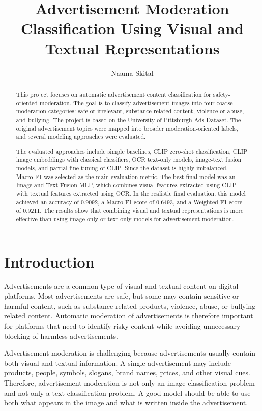 \documentclass[12pt]{article}
\title{Advertisement Moderation Classification Using Visual and Textual Representations}
\author{Naama Skital}
\date{}
\begin{document}
\maketitle

\begin{abstract}
This project focuses on automatic advertisement content classification for safety-oriented moderation. The goal is to classify advertisement images into four coarse moderation categories: safe or irrelevant, substance-related content, violence or abuse, and bullying. The project is based on the University of Pittsburgh Ads Dataset. The original advertisement topics were mapped into broader moderation-oriented labels, and several modeling approaches were evaluated.

The evaluated approaches include simple baselines, CLIP zero-shot classification, CLIP image embeddings with classical classifiers, OCR text-only models, image-text fusion models, and partial fine-tuning of CLIP. Since the dataset is highly imbalanced, Macro-F1 was selected as the main evaluation metric. The best final model was an Image and Text Fusion MLP, which combines visual features extracted using CLIP with textual features extracted using OCR. In the realistic final evaluation, this model achieved an accuracy of 0.9092, a Macro-F1 score of 0.6493, and a Weighted-F1 score of 0.9211. The results show that combining visual and textual representations is more effective than using image-only or text-only models for advertisement moderation.
\end{abstract}

\section{Introduction}

Advertisements are a common type of visual and textual content on digital platforms. Most advertisements are safe, but some may contain sensitive or harmful content, such as substance-related products, violence, abuse, or bullying-related content. Automatic moderation of advertisements is therefore important for platforms that need to identify risky content while avoiding unnecessary blocking of harmless advertisements.

Advertisement moderation is challenging because advertisements usually contain both visual and textual information. A single advertisement may include products, people, symbols, slogans, brand names, prices, and other visual cues. Therefore, advertisement moderation is not only an image classification problem and not only a text classification problem. A good model should be able to use both what appears in the image and what is written inside the advertisement.
\end{document}
